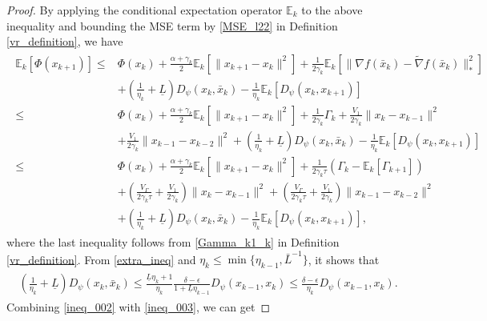 \documentclass[letterpaper]{article} %
\begin{document}
\begin{proof}
		By applying the conditional expectation operator $\mathbb{E}_{k}$ to the above inequality and bounding the MSE term by \eqref{MSE_l22} in Definition \ref{vr_definition},   we have
		\begin{eqnarray}
			\begin{aligned}
				\mathbb{E}_{k}[\Phi(x_{k+1})]\le& \Phi(x_{k}) +\frac{\alpha+\gamma_{k}}{2}\mathbb{E}_{k}[\|x_{k+1}-x_{k}\|^{2}]+\frac{1}{2\gamma_{k}}\mathbb{E}_{k}[\|\nabla f(\bar{x}_{k})-\tilde{\nabla} f(\bar{x}_{k})\|_{*}^{2}]\\
				&+\left(\frac{1}{\eta_{k}}+\underline{L}\right)D_{\psi}(x_{k},\bar{x}_{k}) -\frac{1}{\eta_{k}}\mathbb{E}_{k}[D_{\psi}(x_{k},x_{k+1})]\\
				\le&\Phi(x_{k}) +\frac{\alpha+\gamma_{k}}{2}\mathbb{E}_{k}[\|x_{k+1}-x_{k}\|^{2}]+\frac{1}{2\gamma_{k}}\Gamma_{k}+ \frac{V_{1}}{2\gamma_{k}}\|x_{k}-x_{k-1}\|^{2}\\
				&+\frac{V_{1}}{2\gamma_{k}} \|x_{k-1}-x_{k-2}\|^{2}+\left(\frac{1}{\eta_{k}}+\underline{L}\right)D_{\psi}(x_{k},\bar{x}_{k}) -\frac{1}{\eta_{k}}\mathbb{E}_{k}[D_{\psi}(x_{k},x_{k+1})]\\
				\le&\Phi(x_{k}) +\frac{\alpha+\gamma_{k}}{2}\mathbb{E}_{k}[\|x_{k+1}-x_{k}\|^{2}]+\frac{1}{2\gamma_{k}\tau}(\Gamma_{k}-\mathbb{E}_{k}[\Gamma_{k+1}])\\
				&+\left(\frac{V_{\Gamma}}{2\gamma_{k}\tau}+\frac{V_{1}}{2\gamma_{k}}\right)\|x_{k}-x_{k-1}\|^{2}+\left(\frac{V_{\Gamma}}{2\gamma_{k}\tau}+\frac{V_{1}}{2\gamma_{k}}\right)\|x_{k-1}-x_{k-2}\|^{2}\\
				&+\left(\frac{1}{\eta_{k}}+\underline{L}\right)D_{\psi}(x_{k},\bar{x}_{k}) -\frac{1}{\eta_{k}}\mathbb{E}_{k}[D_{\psi}(x_{k},x_{k+1})],
			\end{aligned}\label{ineq_002}
		\end{eqnarray}
		where the last inequality follows from \eqref{Gamma_k1_k} in Definition \ref{vr_definition}.  From \eqref{extra_ineq} and $\eta_{k}\le\min\{\eta_{k-1},\bar{L}^{-1}\}$, it shows that
		\begin{eqnarray}
			\begin{aligned}
				\left(\frac{1}{\eta_{k}}+\underline{L}\right)D_{\psi}(x_{k},\bar{x}_{k})
				\le \frac{\underline{L}\eta_{k}+1}{\eta_{k}}\frac{\delta-\epsilon}{1+\underline{L}\eta_{k-1}}D_{\psi}(x_{k-1},x_{k})\le\frac{\delta-\epsilon}{\eta_{k}}D_{\psi}(x_{k-1},x_{k}).  \label{ineq_003}
			\end{aligned}
		\end{eqnarray}
		Combining \eqref{ineq_002} with \eqref{ineq_003}, we can get

\end{proof}
\end{document}
